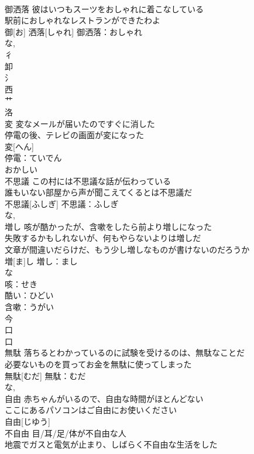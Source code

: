 \documentclass[8pt]{extreport}
\begin{document}
\begin{CJK}{UTF8}{min}
\\	御洒落	彼はいつもスーツをおしゃれに着こなしている 
\\	駅前におしゃれなレストランができたわよ 
\\	御[お] 洒落[しゃれ]			御洒落：おしゃれ
\\	な, 
\\	彳 
\\	卸 
\\	氵 
\\	西 
\\	艹 
\\	洛 
\\	変	変なメールが届いたのですぐに消した 
\\	停電の後、テレビの画面が変になった 
\\	変[へん]			
\\	停電：ていでん
\\	おかしい 
\\	不思議	この村には不思議な話が伝わっている 
\\	誰もいない部屋から声が聞こえてくるとは不思議だ 
\\	不思議[ふしぎ]			不思議：ふしぎ
\\	な, 
\\	増し	咳が酷かったが、含嗽をしたら前より増しになった 
\\	失敗するかもしれないが、何もやらないよりは増しだ 
\\	文章が間違いだらけだ、もう少し増しなものが書けないのだろうか 
\\	増[ま]し			増し：まし
\\	な
\\	咳：せき
\\	酷い：ひどい
\\	含嗽：うがい
\\	今 
\\	口 
\\	口 
\\	無駄	落ちるとわかっているのに試験を受けるのは、無駄なことだ 
\\	必要ないものを買ってお金を無駄に使ってしまった 
\\	無駄[むだ]			無駄：むだ
\\	な, 
\\	自由	赤ちゃんがいるので、自由な時間がほとんどない 
\\	ここにあるパソコンはご自由にお使いください 
\\	自由[じゆう]						
\\	不自由	目/耳/足/体が不自由な人 
\\	地震でガスと電気が止まり、しばらく不自由な生活をした 

\end{CJK}
\end{document}
